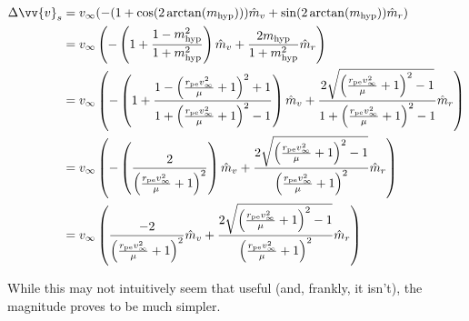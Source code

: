 \documentclass[../main.tex]{subfiles}
\begin{document}
\begin{align*}
    \Delta\vv{v}_s & = v_\infty(-(1+\cos(2\arctan(m_\text{hyp})))\hat{m}_v+\sin(2\arctan(m_\text{hyp}))\hat{m}_r)                                                                                                                                                                                                               \\
                   & = v_\infty\left(-\left(1+\frac{1-m_\text{hyp}^2}{1+m_\text{hyp}^2}\right)\hat{m}_v+\frac{2m_\text{hyp}}{1+m_\text{hyp}^2}\hat{m}_r\right)                                                                                                                                                                  \\
                   & = v_\infty\left(-\left(1+\frac{1-\left(\frac{r_\text{pe}v_\infty^2}{\mu}+1\right)^2+1}{1+\left(\frac{r_\text{pe}v_\infty^2}{\mu}+1\right)^2-1}\right)\hat{m}_v+\frac{2\sqrt{\left(\frac{r_\text{pe}v_\infty^2}{\mu}+1\right)^2-1}}{1+\left(\frac{r_\text{pe}v_\infty^2}{\mu}+1\right)^2-1}\hat{m}_r\right) \\
                   & = v_\infty\left(-\left(\frac{2}{\left(\frac{r_\text{pe}v_\infty^2}{\mu}+1\right)^2}\right)\hat{m}_v+\frac{2\sqrt{\left(\frac{r_\text{pe}v_\infty^2}{\mu}+1\right)^2-1}}{\left(\frac{r_\text{pe}v_\infty^2}{\mu}+1\right)^2}\hat{m}_r\right)                                                                \\
                   & = v_\infty\left(\frac{-2}{\left(\frac{r_\text{pe}v_\infty^2}{\mu}+1\right)^2}\hat{m}_v+\frac{2\sqrt{\left(\frac{r_\text{pe}v_\infty^2}{\mu}+1\right)^2-1}}{\left(\frac{r_\text{pe}v_\infty^2}{\mu}+1\right)^2}\hat{m}_r\right)                                                                             \\
\end{align*}

While this may not intuitively seem that useful (and, frankly, it isn't), the magnitude proves to be much simpler.
\end{document}
